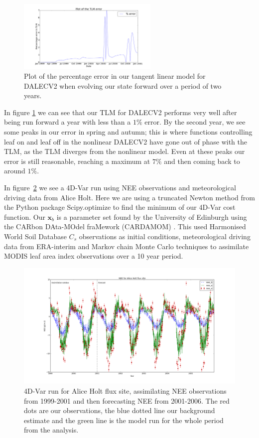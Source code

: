 \documentclass[11pt]{article}
\begin{document}
\begin{figure}[ht]
    \centering
    \includegraphics[width=0.6\textwidth]{tlm_error.png}
    \caption{Plot of the percentage error in our tangent linear model for DALECV2 when evolving our state forward over a period of two years.}
    \label{fig:tlm_error}
\end{figure}

In figure \ref{fig:tlm_error} we can see that our TLM for DALECV2 performs very well after being run forward a year with less than a $1\%$ error. By the second year, we see some peaks in our error in spring and autumn; this is where functions controlling leaf on and leaf off in the nonlinear DALECV2 have gone out of phase with the TLM, as the TLM diverges from the nonlinear model. Even at these peaks our error is still reasonable, reaching a maximum at $7\%$ and then coming back to around $1\%$. 

In figure~\ref{fig:4dvar} we see a 4D-Var run using NEE observations and meteorological driving data from Alice Holt. Here we are using a truncated Newton method \citep{Nocedal1999} from the Python package Scipy.optimize to find the minimum of our 4D-Var cost function. Our $\textbf{x}_b$ is a parameter set found by the University of Edinburgh using the CARbon DAta-MOdel fraMework (CARDAMOM) \citep{Exbrayat2015}. This used Harmonised World Soil Database $C_{s}$ observations as initial conditions, meteorological driving data from ERA-interim and Markov chain Monte Carlo techniques to assimilate MODIS leaf area index observations over a 10 year period. 

\begin{figure}[!h]
    \centering
    \includegraphics[width=.9\textwidth]{ah_assim_edinpvals.png}
    \caption{4D-Var run for Alice Holt flux site, assimilating NEE observations from 1999-2001 and then forecasting NEE from 2001-2006. The red dots are our observations, the blue dotted line our background estimate and the green line is the model run for the whole period from the analysis.}
    \label{fig:4dvar}
\end{figure}
\end{document}
